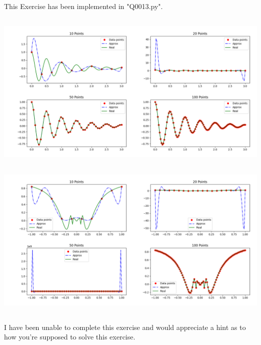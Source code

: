 This Exercise has been implemented in "Q0013.py".
\subsection{}
\subsection{}
\includegraphics[width=\linewidth]{plots}
\subsection{}
\includegraphics[width=\linewidth]{plots1}
\subsection{}
I have been unable to complete this exercise and would appreciate a hint as to how you're supposed to solve this exercise.
